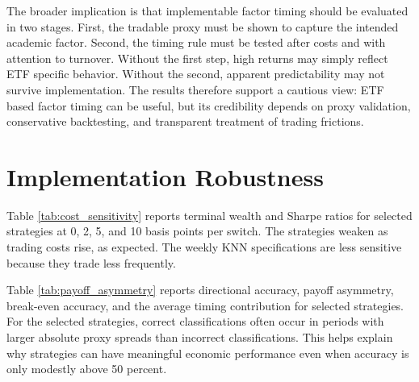 \documentclass[investment,article,submit,pdftex,moreauthors]{Definitions/mdpi}
\begin{document}
The broader implication is that implementable factor timing should be evaluated in two stages. First, the tradable proxy must be shown to capture the intended academic factor. Second, the timing rule must be tested after costs and with attention to turnover. Without the first step, high returns may simply reflect ETF specific behavior. Without the second, apparent predictability may not survive implementation. The results therefore support a cautious view: ETF based factor timing can be useful, but its credibility depends on proxy validation, conservative backtesting, and transparent treatment of trading frictions.

\appendix
\section{Implementation Robustness}
\label{app:robustness}

Table \ref{tab:cost_sensitivity} reports terminal wealth and Sharpe ratios for selected strategies at 0, 2, 5, and 10 basis points per switch. The strategies weaken as trading costs rise, as expected. The weekly KNN specifications are less sensitive because they trade less frequently.

\begin{table}[H]
\centering
\caption{Transaction cost sensitivity: final wealth and Sharpe ratio}
\label{tab:cost_sensitivity}
\scriptsize
{}
\end{table}

Table \ref{tab:payoff_asymmetry} reports directional accuracy, payoff asymmetry, break-even accuracy, and the average timing contribution for selected strategies. For the selected strategies, correct classifications often occur in periods with larger absolute proxy spreads than incorrect classifications. This helps explain why strategies can have meaningful economic performance even when accuracy is only modestly above 50 percent.
\end{document}
